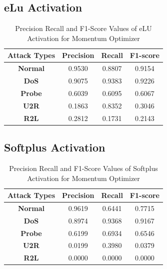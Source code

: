 \documentclass[12pt, a4paper]{report}
\begin{document}
\begin{appendices}
	\subsection{eLu Activation}
 	  \begin{table}[h]
		\centering
		\captionsetup{justification=centering,margin=2cm}
		\begin{tabular}{|c|c|c|c|}
		\hline
		\textbf{Attack Types} & \textbf{Precision} & \textbf{Recall} & \textbf{F1-score} \\ \hline
		\textbf{Normal}       & 0.9530             & 0.8807          & 0.9154            \\ \hline
		\textbf{DoS}          & 0.9075             & 0.9383          & 0.9226            \\ \hline
		\textbf{Probe}        & 0.6039             & 0.6095          & 0.6067            \\ \hline
		\textbf{U2R}          & 0.1863             & 0.8352          & 0.3046            \\ \hline
		\textbf{R2L}          & 0.2812             & 0.1731          & 0.2143            \\ \hline
		\end{tabular}
		\caption{Precision Recall and F1-Score Values of eLU Activation for Momentum Optimizer}
		\label{classification elu Momentum tflearn}
		\end{table} 

	\subsection{Softplus Activation}
 	  \begin{table}[h]
		\centering
		\captionsetup{justification=centering,margin=2cm}
		\begin{tabular}{|c|c|c|c|}
		\hline
		\textbf{Attack Types} & \textbf{Precision} & \textbf{Recall} & \textbf{F1-score} \\ \hline
		\textbf{Normal}       & 0.9619             & 0.6441          & 0.7715            \\ \hline
		\textbf{DoS}          & 0.8974             & 0.9368          & 0.9167            \\ \hline
		\textbf{Probe}        & 0.6199             & 0.6934          & 0.6546            \\ \hline
		\textbf{U2R}          & 0.0199             & 0.3980          & 0.0379            \\ \hline
		\textbf{R2L}          & 0.0000             & 0.0000          & 0.0000            \\ \hline
		\end{tabular}
		\caption{Precision Recall and F1-Score Values of Softplus Activation for Momentum Optimizer}
		\label{classification softplus Momentum tflearn}
		\end{table} 


\end{appendices}
\end{document}
